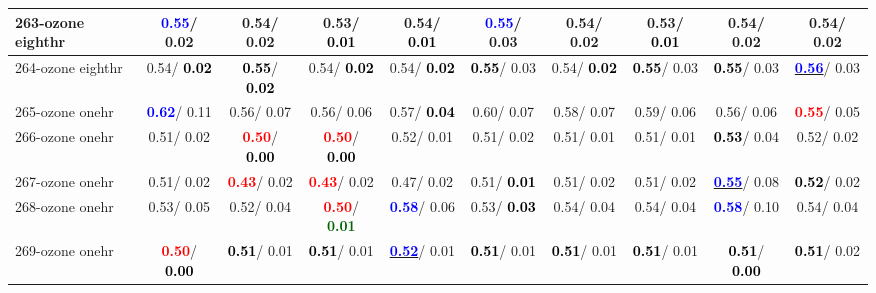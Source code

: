 \begin{table}[h]
\begin{center}
{\begin{tabular}{lc|c|c|c|c|c|c|c|c}
263-ozone eighthr & \textcolor{blue}{\textbf{  0.55}}/  0.02 &   0.54/  0.02 &   0.53/\textcolor{black}{\textbf{  0.01}} &   0.54/\textcolor{black}{\textbf{  0.01}} & \textcolor{blue}{\textbf{  0.55}}/  0.03 &   0.54/  0.02 &   0.53/\textcolor{black}{\textbf{  0.01}} &   0.54/  0.02 &   0.54/  0.02 \\ \hline
264-ozone eighthr &   0.54/\textcolor{black}{\textbf{  0.02}} & \textcolor{black}{\textbf{  0.55}}/\textcolor{black}{\textbf{  0.02}} &   0.54/\textcolor{black}{\textbf{  0.02}} &   0.54/\textcolor{black}{\textbf{  0.02}} & \textcolor{black}{\textbf{  0.55}}/  0.03 &   0.54/\textcolor{black}{\textbf{  0.02}} & \textcolor{black}{\textbf{  0.55}}/  0.03 & \textcolor{black}{\textbf{  0.55}}/  0.03 & \underline{\textcolor{blue}{\textbf{  0.56}}}/  0.03 \\
265-ozone onehr & \textcolor{blue}{\textbf{  0.62}}/  0.11 &   0.56/  0.07 &   0.56/  0.06 &   0.57/\textcolor{black}{\textbf{  0.04}} &   0.60/  0.07 &   0.58/  0.07 &   0.59/  0.06 &   0.56/  0.06 & \textcolor{red}{\textbf{  0.55}}/  0.05 \\
266-ozone onehr &   0.51/  0.02 & \textcolor{red}{\textbf{  0.50}}/\textcolor{black}{\textbf{  0.00}} & \textcolor{red}{\textbf{  0.50}}/\textcolor{black}{\textbf{  0.00}} &   0.52/  0.01 &   0.51/  0.02 &   0.51/  0.01 &   0.51/  0.01 & \textcolor{black}{\textbf{  0.53}}/  0.04 &   0.52/  0.02 \\
267-ozone onehr &   0.51/  0.02 & \textcolor{red}{\textbf{  0.43}}/  0.02 & \textcolor{red}{\textbf{  0.43}}/  0.02 &   0.47/  0.02 &   0.51/\textcolor{black}{\textbf{  0.01}} &   0.51/  0.02 &   0.51/  0.02 & \underline{\textcolor{blue}{\textbf{  0.55}}}/  0.08 & \textcolor{black}{\textbf{  0.52}}/  0.02 \\
268-ozone onehr &   0.53/  0.05 &   0.52/  0.04 & \textcolor{red}{\textbf{  0.50}}/\textcolor{darkgreen}{\textbf{  0.01}} & \textcolor{blue}{\textbf{  0.58}}/  0.06 &   0.53/\textcolor{black}{\textbf{  0.03}} &   0.54/  0.04 &   0.54/  0.04 & \textcolor{blue}{\textbf{  0.58}}/  0.10 &   0.54/  0.04 \\
269-ozone onehr & \textcolor{red}{\textbf{  0.50}}/\textcolor{black}{\textbf{  0.00}} & \textcolor{black}{\textbf{  0.51}}/  0.01 & \textcolor{black}{\textbf{  0.51}}/  0.01 & \underline{\textcolor{blue}{\textbf{  0.52}}}/  0.01 & \textcolor{black}{\textbf{  0.51}}/  0.01 & \textcolor{black}{\textbf{  0.51}}/  0.01 & \textcolor{black}{\textbf{  0.51}}/  0.01 & \textcolor{black}{\textbf{  0.51}}/\textcolor{black}{\textbf{  0.00}} & \textcolor{black}{\textbf{  0.51}}/  0.02 \\

\end{tabular}}
\end{center}
\end{table}
